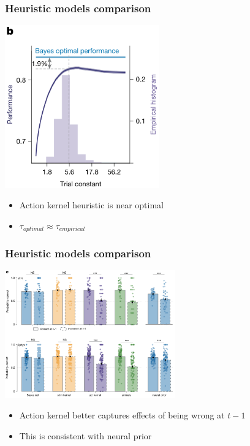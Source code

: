 \documentclass{beamer}
\begin{document}
\begin{frame}
  \frametitle{Heuristic models comparison}
  \begin{center}
    \includegraphics[width=0.5\textwidth, keepaspectratio]{./figure4b}
  \end{center}
  \begin{itemize}
    \item Action kernel heuristic is near optimal
    \item $\tau_{optimal} \approx \tau_{empirical}$
  \end{itemize}
\end{frame}

\begin{frame}
  \frametitle{Heuristic models comparison}
  \begin{center}
    \includegraphics[width=0.55\textwidth, keepaspectratio]{./figure4c}
  \end{center}
  \begin{itemize}
    \item Action kernel better captures effects of being wrong at $t-1$
    \item This is consistent with neural prior
  \end{itemize}
\end{frame}
\end{document}
